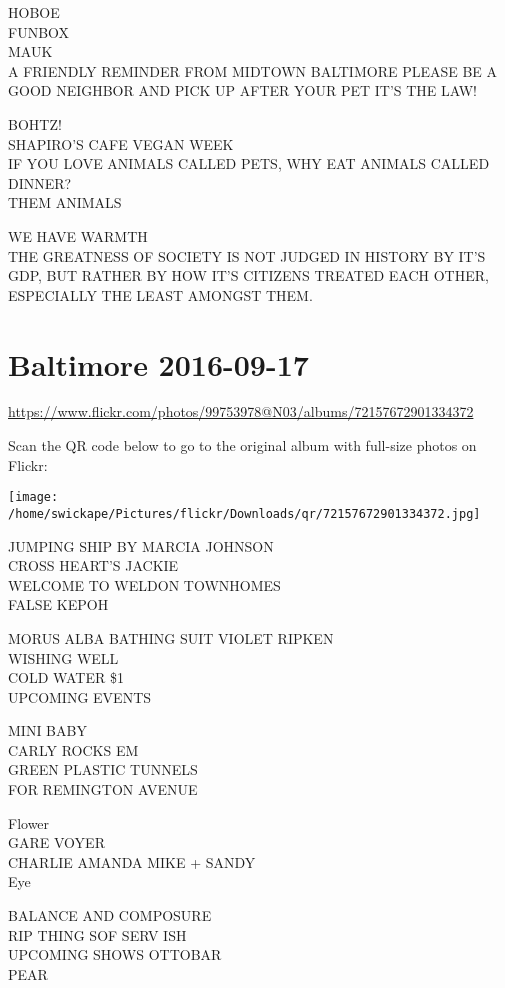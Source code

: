 \documentclass[10pt,letterpaper]{article}
\begin{document}
HOBOE\\
FUNBOX\\
MAUK\\
A FRIENDLY REMINDER FROM MIDTOWN BALTIMORE PLEASE BE A GOOD NEIGHBOR AND PICK UP AFTER YOUR PET IT'S THE LAW!

BOHTZ!\\
SHAPIRO'S CAFE VEGAN WEEK\\
IF YOU LOVE ANIMALS CALLED PETS, WHY EAT ANIMALS CALLED DINNER?\\
THEM ANIMALS

WE HAVE WARMTH\\
THE GREATNESS OF SOCIETY IS NOT JUDGED IN HISTORY BY IT'S GDP, BUT RATHER BY HOW IT'S CITIZENS TREATED EACH OTHER, ESPECIALLY THE LEAST AMONGST THEM.


\section*{Baltimore 2016-09-17}

\url{https://www.flickr.com/photos/99753978@N03/albums/72157672901334372}

Scan the QR code below to go to the original album with full-size photos on Flickr:

\texttt{[image: /home/swickape/Pictures/flickr/Downloads/qr/72157672901334372.jpg]}


JUMPING SHIP BY MARCIA JOHNSON\\
CROSS HEART'S JACKIE\\
WELCOME TO WELDON TOWNHOMES\\
FALSE KEPOH

MORUS ALBA BATHING SUIT VIOLET RIPKEN\\
WISHING WELL\\
COLD WATER \$1\\
UPCOMING EVENTS

MINI BABY\\
CARLY ROCKS EM\\
GREEN PLASTIC TUNNELS\\
FOR REMINGTON AVENUE

Flower\\
GARE VOYER\\
CHARLIE AMANDA MIKE + SANDY\\
Eye

BALANCE AND COMPOSURE\\
RIP THING SOF SERV ISH\\
UPCOMING SHOWS OTTOBAR\\
PEAR
\end{document}
